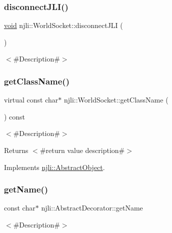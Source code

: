 \subsubsection{\texorpdfstring{disconnect\+J\+L\+I()}{disconnectJLI()}}
{\footnotesize\ttfamily \mbox{\hyperlink{_thread_8h_af1e856da2e658414cb2456cb6f7ebc66}{void}} njli\+::\+World\+Socket\+::disconnect\+J\+LI (\begin{DoxyParamCaption}{ }\end{DoxyParamCaption})}

$<$\#\+Description\#$>$ \mbox{\label{classnjli_1_1_world_socket_a5a98ed3511ee0c2784ad14e36a6a6fd0}} 
\subsubsection{\texorpdfstring{get\+Class\+Name()}{getClassName()}}
{\footnotesize\ttfamily virtual const char$\ast$ njli\+::\+World\+Socket\+::get\+Class\+Name (\begin{DoxyParamCaption}{ }\end{DoxyParamCaption}) const\hspace{0.3cm}{\ttfamily [virtual]}}

$<$\#\+Description\#$>$

\begin{DoxyReturn}{Returns}
$<$\#return value description\#$>$ 
\end{DoxyReturn}


Implements \mbox{\hyperlink{classnjli_1_1_abstract_object_afdabb48c4bf763e297ffe810b433a863}{njli\+::\+Abstract\+Object}}.

\mbox{\label{classnjli_1_1_world_socket_ad41266885be835f3ee602311e20877a4}} 
\subsubsection{\texorpdfstring{get\+Name()}{getName()}}
{\footnotesize\ttfamily const char$\ast$ njli\+::\+Abstract\+Decorator\+::get\+Name}

$<$\#\+Description\#$>$

